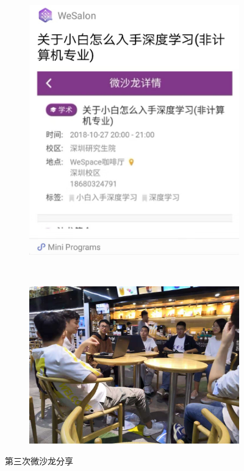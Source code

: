 \documentclass[12pt]{ctexart}
\begin{document}
\begin{figure}[!ht]
\centering
  \begin{subfigure}[b]{0.4\textwidth}
  \includegraphics[width=\textwidth]{3/3.jpeg}  
    \end{subfigure}~
      \begin{subfigure}[b]{0.5\textwidth}
  \includegraphics[width=\textwidth]{3/wesalon.jpeg}  
    \end{subfigure}
    \caption{第三次微沙龙分享}        
\end{figure}
\end{document}
